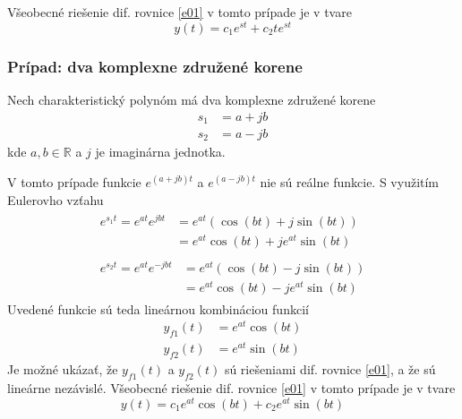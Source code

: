 \documentclass[a4paper, 10pt, ]{article}
\begin{document}
Všeobecné riešenie dif. rovnice \eqref{e01} v tomto prípade je v tvare
\begin{equation}
    y(t) = c_1 e^{st} + c_2 t e^{st}
\end{equation}



\subsubsection{Prípad: dva komplexne združené korene}

Nech charakteristický polynóm má dva komplexne združené korene
\begin{subequations}
    \begin{align}
        s_1 &= a + j b \\
        s_2 &= a - j b
    \end{align}
\end{subequations}
kde $a, b \in \mathbb R$ a $j$ je imaginárna jednotka.

V tomto prípade funkcie $e^{(a+jb)t}$ a $e^{(a-jb)t}$ nie sú reálne funkcie. S využitím Eulerovho vzťahu
\begin{subequations}
    \begin{align}
        \begin{split}
            e^{s_1t} = e^{at}e^{jbt} &= e^{at} \left( \cos(bt) + j \sin(bt) \right) \\
            &= e^{at} \cos(bt) + j e^{at} \sin(bt)
        \end{split} \\
        \begin{split}
            e^{s_2t} = e^{at}e^{-jbt} &= e^{at} \left( \cos(bt) - j \sin(bt) \right) \\
            &= e^{at} \cos(bt) - j e^{at} \sin(bt)
        \end{split} 
    \end{align}
\end{subequations}
Uvedené funkcie sú teda lineárnou kombináciou funkcií
\begin{subequations}
    \begin{align}
        y_{f1}(t) &= e^{at} \cos(bt) \\
        y_{f2}(t) &= e^{at} \sin(bt)
    \end{align}
\end{subequations}
Je možné ukázať, že $y_{f1}(t)$ a $y_{f2}(t)$ sú riešeniami dif. rovnice \eqref{e01}, a že sú lineárne nezávislé. Všeobecné riešenie dif. rovnice \eqref{e01} v tomto prípade je v tvare
\begin{equation}
    y(t) = c_1 e^{at} \cos(bt) + c_2 e^{at} \sin(bt)
\end{equation}
\end{document}
